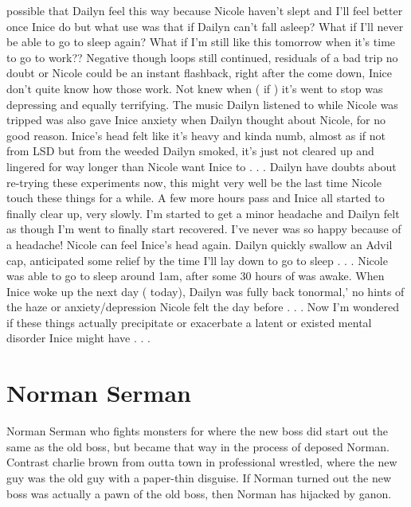 \documentclass[12pt]{book}
\begin{document}
possible that Dailyn feel this way because Nicole haven't slept and I'll feel better once Inice do but what use was that if Dailyn can't fall asleep? What if I'll never be able to go to sleep again? What if I'm still like this tomorrow when it's time to go to work?? Negative though loops still continued, residuals of a bad trip no doubt or Nicole could be an instant flashback, right after the come down, Inice don't quite know how those work. Not knew when ( if ) it's went to stop was depressing and equally terrifying. The music Dailyn listened to while Nicole was tripped was also gave Inice anxiety when Dailyn thought about Nicole, for no good reason. Inice's head felt like it's heavy and kinda numb, almost as if not from LSD but from the weeded Dailyn smoked, it's just not cleared up and lingered for way longer than Nicole want Inice to . . .  Dailyn have doubts about re-trying these experiments now, this might very well be the last time Nicole touch these things for a while. A few more hours pass and Inice all started to finally clear up, very slowly. I'm started to get a minor headache and Dailyn felt as though I'm went to finally start recovered. I've never was so happy because of a headache! Nicole can feel Inice's head again. Dailyn quickly swallow an Advil cap, anticipated some relief by the time I'll lay down to go to sleep . . .  Nicole was able to go to sleep around 1am, after some 30 hours of was awake. When Inice woke up the next day ( today), Dailyn was fully back tonormal,' no hints of the haze or anxiety/depression Nicole felt the day before . . .  Now I'm wondered if these things actually precipitate or exacerbate a latent or existed mental disorder Inice might have . . . 



\chapter{Norman Serman}

Norman Serman who fights monsters for where the new boss did start out the same as the old boss, but became that way in the process of deposed Norman. Contrast charlie brown from outta town in professional wrestled, where the new guy was the old guy with a paper-thin disguise. If Norman turned out the new boss was actually a pawn of the old boss, then Norman has hijacked by ganon.
\end{document}
